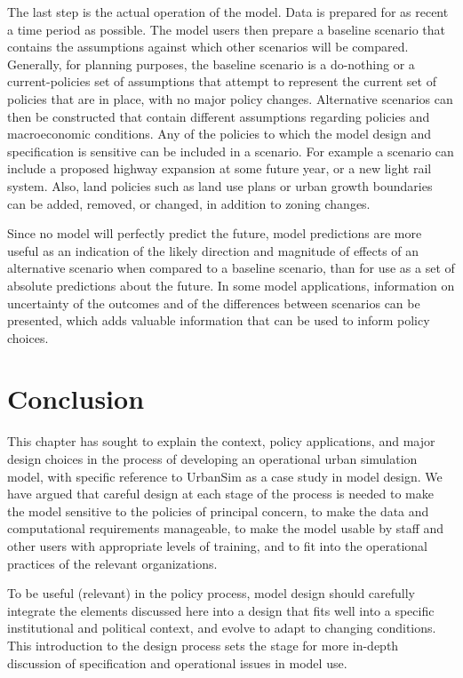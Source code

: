 The last step is the actual operation of the model. Data is prepared for as recent a time period as possible. The model users then prepare a baseline scenario that contains the assumptions against which other scenarios will be compared.  Generally, for planning purposes, the baseline scenario is a do-nothing or a current-policies set of assumptions that attempt to represent the current set of policies that are in place, with no major policy changes.  Alternative scenarios can then be constructed that contain different assumptions regarding policies and macroeconomic conditions.  Any of the policies to which the model design and specification is sensitive can be included in a scenario.  For example a scenario can include a proposed highway expansion at some future year, or a new light rail system. Also, land policies such as land use plans or urban growth boundaries can be added, removed, or changed, in addition to zoning changes.

Since no model will perfectly predict the future, model predictions are more useful as an indication of the likely direction and magnitude of effects of an alternative scenario when compared to a baseline scenario, than for use as a set of absolute predictions about the future.  In some model applications, information on uncertainty of the outcomes and of the differences between scenarios can be presented, which adds valuable information that can be used to inform policy choices.


\section{Conclusion}

This chapter has sought to explain the context, policy applications, and major design choices in the process of developing an operational urban simulation model, with specific reference to UrbanSim as a case study in model design.  We have argued that careful design at each stage of the process is needed to make the model sensitive to the policies of principal concern, to make the data and computational requirements manageable, to make the model usable by staff and other users with appropriate levels of training, and to fit into the operational practices of the relevant organizations.

To be useful (relevant) in the policy process, model design should carefully integrate the elements discussed here into a design that fits well into a specific institutional and political context, and evolve to adapt to changing conditions.  This introduction to the design process sets the stage for more in-depth discussion of specification and operational issues in model use.

